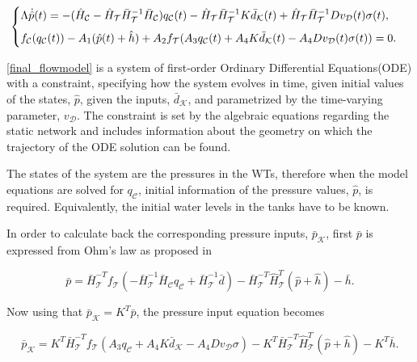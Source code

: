 \begin{equation}
\label{final_flowmodel}
\begin{cases}
    \Lambda \dot{\hat{p}}(t) = - (\hat{H}_{\mathcal{C}} - \hat{H}_{\mathcal{T}} \bar{H}^{-1}_{\mathcal{T}}\bar{H}_{\mathcal{C}})  q_\mathcal{C}(t)  - \hat{H}_{\mathcal{T}} \bar{H}^{-1}_{\mathcal{T}} K \bar{d}_{\mathcal{K}}(t) + \hat{H}_{\mathcal{T}} \bar{H}^{-1}_{\mathcal{T}} D v_{\mathcal{D}}(t) \sigma(t), \vspace{2mm}\\
    f_{\mathcal{C}}(q_\mathcal{C}(t)) - A_1(\hat{p}(t) + \hat{h}) + A_2 f_{\mathcal{T}}(A_3 q_\mathcal{C}(t) + A_4 K \bar{d}_{\mathcal{K}}(t) - A_4 D v_{\mathcal{D}}(t) \sigma(t)) = 0.
\end{cases}
\end{equation}

\eqref{final_flowmodel} is a system of first-order Ordinary Differential Equations(ODE) with a constraint, specifying how the system evolves in time, given initial values of the states, $\hat{p}$, given the inputs, $\bar{d}_{\mathcal{K}}$, and parametrized by the time-varying parameter, $v_{\mathcal{D}}$. The constraint is set by the algebraic equations regarding the static network and includes information about the geometry on which the trajectory of the ODE solution can be found. 

The states of the system are the pressures in the WTs, therefore when the model equations are solved for $q_\mathcal{C}$, initial information of the pressure values, $\hat{p}$, is required. Equivalently, the initial water levels in the tanks have to be known. 

In order to calculate back the corresponding pressure inputs, $\bar{p}_{\mathcal{K}}$, first $\bar{p}$ is expressed from Ohm's law as proposed in 

\begin{equation}
  \label{non-inlet_p_WT}
  \bar{p} =  \bar{H}^{-T}_{\mathcal{T}}f_{\mathcal{T}}(-\bar{H}^{-1}_{\mathcal{T}} \bar{H}_{\mathcal{C}} q_\mathcal{C} + \bar{H}^{-1}_{\mathcal{T}} \bar{d}) - \bar{H}^{-T}_{\mathcal{T}}\hat{H}^{T}_{\mathcal{T}} (\hat{p} + \hat{h}) - \bar{h} .
\end{equation}

Now using that $\bar{p}_{\mathcal{K}} = K^T \bar{p} $, the pressure input equation becomes

\begin{equation}
  \label{non-inlet_p_WT1}
  \bar{p}_{\mathcal{K}} = K^T \bar{H}^{-T}_{\mathcal{T}}f_{\mathcal{T}}(A_3 q_\mathcal{C} + A_4 K \bar{d}_{\mathcal{K}} - A_4 D v_{\mathcal{D}} \sigma) - K^T\bar{H}^{-T}_{\mathcal{T}}\hat{H}^{T}_{\mathcal{T}} (\hat{p} + \hat{h}) - K^T\bar{h} .
\end{equation}

